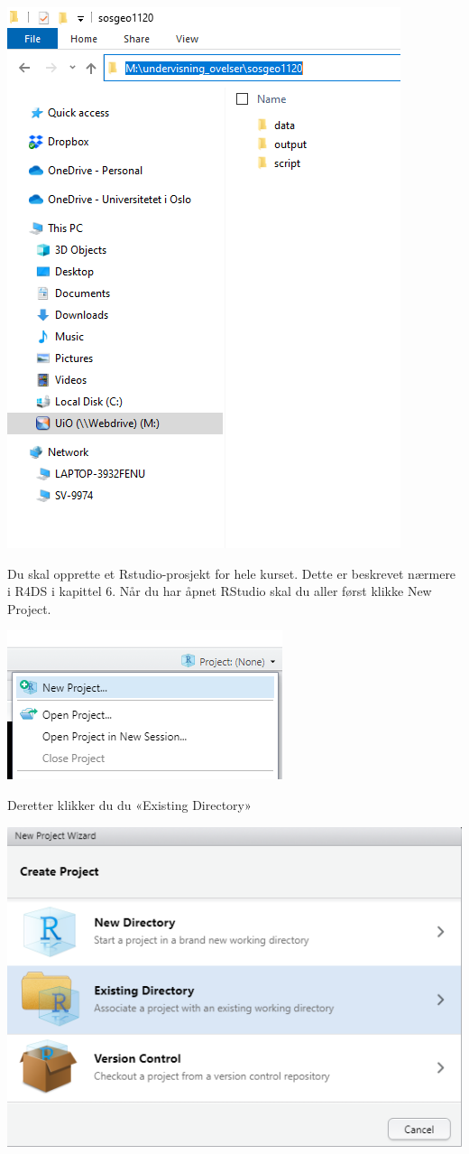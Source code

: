 \documentclass[
  letterpaper,
  DIV=11,
  numbers=noendperiod]{scrreprt}
\theoremstyle{definition}
\theoremstyle{remark}
\begin{document}
\includegraphics{./images/proj1.png}

Du skal opprette et Rstudio-prosjekt for hele kurset. Dette er beskrevet
nærmere i R4DS i kapittel 6. Når du har åpnet RStudio skal du aller
først klikke New Project.

\includegraphics{./images/proj2.png}

Deretter klikker du du «Existing Directory»

\includegraphics{./images/proj3.png}
\end{document}
